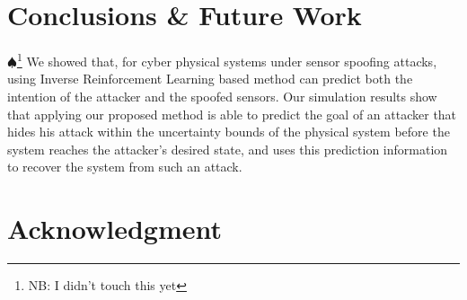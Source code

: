 \documentclass[letterpaper, 10 pt, conference]{ieeeconf}  %
\newcommand\NB[1]{$\spadesuit$\footnote{NB: #1}}
\begin{document}
\section{Conclusions \& Future Work}\label{sec:conclusion}
\NB{I didn't touch this yet} We showed that, for cyber physical systems under sensor spoofing attacks, using Inverse Reinforcement Learning based method can predict both the intention of the attacker and the spoofed sensors. Our simulation results show that applying our proposed method is able to predict the goal of an attacker that hides his attack within the uncertainty bounds of the physical system before the system reaches the attacker's desired state, and uses this prediction information to recover the system from such an attack.
\section*{Acknowledgment}


%
%
%


\end{document}
